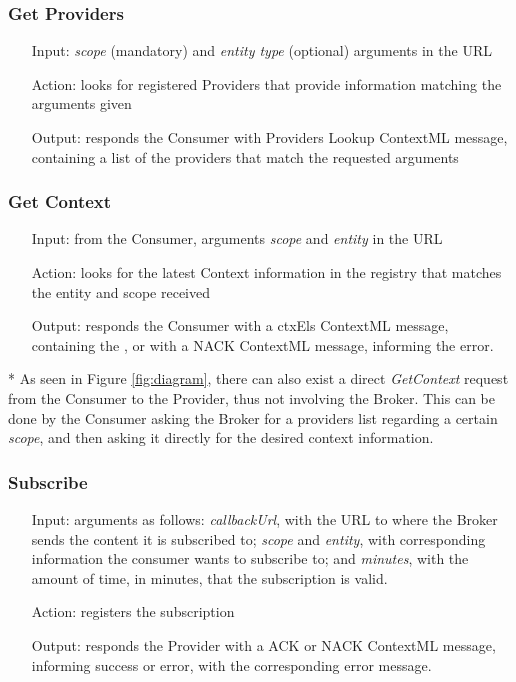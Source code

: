 \subsubsection{Get Providers}
\begin{itemize}
	\item[Input:] \textit{scope} (mandatory) and \textit{entity type} (optional) arguments in the URL
	
	\item[Action:] looks for registered Providers that provide information matching the arguments given
	
	\item[Output:] responds the Consumer with Providers Lookup ContextML message, containing a list of the providers that match the requested arguments
\end{itemize}

\subsubsection{Get Context}
\begin{itemize}
	\item[Input:] from the Consumer, arguments \textit{scope} and \textit{entity} in the URL
	
	\item[Action:] looks for the latest Context information in the registry that matches the entity and scope received
	
	\item[Output:] responds the Consumer with a ctxEls ContextML message, containing the , or with a NACK ContextML message, informing the error.
	
\end{itemize}
* As seen in Figure \ref{fig:diagram}, there can also exist a direct \textit{GetContext} request from the Consumer to the Provider, thus not involving the Broker. This can be done by the Consumer asking the Broker for a providers list regarding a certain \textit{scope}, and then asking it directly for the desired context information. 

\subsubsection{Subscribe}
\begin{itemize}
	\item[Input:] arguments as follows:  \textit{callbackUrl}, with the URL to where the Broker sends the content it is subscribed to; \textit{scope} and \textit{entity}, with corresponding information the consumer wants to subscribe to; and \textit{minutes}, with the amount of time, in minutes, that the subscription is valid.
	
	\item[Action:] registers the subscription
	
	\item[Output:] responds the Provider with a ACK or NACK ContextML message, informing success or error, with the corresponding error message.
\end{itemize}

